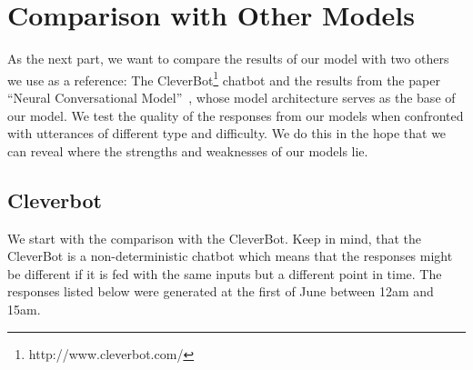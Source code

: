 \section{Comparison with Other Models}
As the next part, we want to compare the results of our model with two others we use as a reference: The CleverBot\footnote{http://www.cleverbot.com/} chatbot and the results from the paper ``Neural Conversational Model''~\cite{Vinyals:2015}, whose model architecture serves as the base of our model. We test the quality of the responses from our models when confronted with utterances of different type and difficulty. We do this in the hope that we can reveal where the strengths and weaknesses of our models lie.

\subsection{Cleverbot}
We start with the comparison with the CleverBot. Keep in mind, that the CleverBot is a non-deterministic chatbot which means that the responses might be different if it is fed with the same inputs but a different point in time. The responses listed below were generated at the first of June between 12am and 15am.

